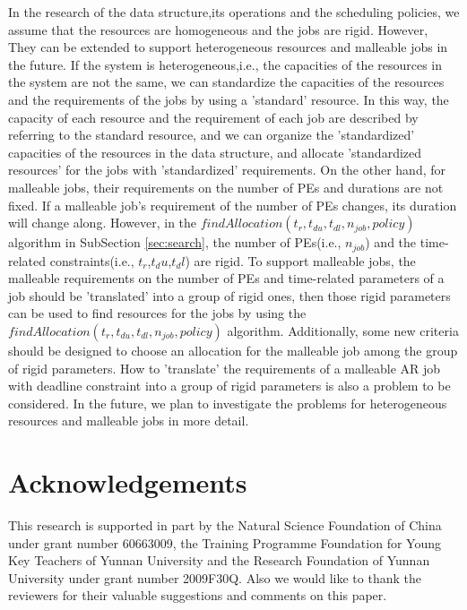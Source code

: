 \documentclass[preprint,12pt]{elsarticle}
\begin{document}
In the research of the data structure,its operations and the scheduling policies, we assume that the resources are homogeneous and the jobs are rigid. However, They can be extended to support heterogeneous resources and malleable jobs in the future. If the system is heterogeneous,i.e., the capacities of the resources in the system are not the same, we can standardize the capacities of the resources and the requirements of the jobs by using a 'standard' resource. In this way, the capacity of each resource and the requirement of each job are described by referring to the standard resource, and we can organize the 'standardized' capacities of the resources in the data structure, and allocate 'standardized resources' for the jobs with 'standardized' requirements. On the other hand, for malleable jobs, their requirements on the number of PEs and durations are not fixed. If a malleable job's requirement of the number of PEs changes, its duration will change along. However, in the $findAllocation(t_r,t_{du},t_{dl},n_{job},policy)$ algorithm in SubSection \ref{sec:search}, the number of PEs(i.e., $n_{job}$) and the time-related constraints(i.e., $t_r$,$t_du$,$t_dl$) are rigid. To support malleable jobs, the malleable requirements on the number of PEs and time-related parameters of a job should be 'translated' into a group of rigid ones, then those rigid parameters can be used to find resources for the jobs by using  the $findAllocation(t_r,t_{du},t_{dl},n_{job},policy)$ algorithm. Additionally, some new criteria should be designed to choose an allocation for the malleable job among the group of rigid parameters. How to 'translate' the requirements of a malleable AR job with deadline constraint into a group of rigid parameters is also a problem to be considered. In the future, we plan to investigate the problems for heterogeneous resources and malleable jobs in more detail.

\section*{Acknowledgements}
This research is supported in part by the Natural Science Foundation of China under grant number 60663009, the Training Programme Foundation for Young Key Teachers of Yunnan University and the Research Foundation of Yunnan University under grant number 2009F30Q. Also we would like to thank the reviewers for their valuable suggestions and comments on this paper.


\end{document}
